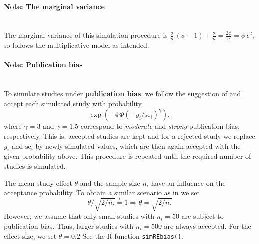\documentclass[letterpaper, 9pt]{article}
\begin{document}
\paragraph{Note: The marginal variance}\mbox{}\\
The marginal variance of this simulation procedure is
$\frac{2}{n} \, (\phi-1) + \frac{2}{n} = \frac{2\phi}{n} = \phi \, \epsilon^2$, so follows the multiplicative
model as intended.


\paragraph{Note: Publication bias}\mbox{}\\
To simulate studies under \textbf{publication bias}, we follow the suggestion of \citet{henm:copa:10} and accept each simulated study with probability
$$\exp(-4\, \Phi(-y_i / \text{se}_i)^\gamma ),$$
where $\gamma = 3$ and $\gamma = 1.5$ correspond to \emph{moderate} and \emph{strong} publication bias, respectively.
This is, accepted studies are kept and for a rejected study we replace $y_i$ and $\text{se}_i$ by newly simulated values, which are then again accepted with the given probability above.
This procedure is repeated until the required number of studies is simulated. 

The mean study effect $\theta$ and the sample size $n_i$ have an influence on the acceptance probability.
To obtain a similar scenario as in \citet{henm:copa:10} we set
$$ \theta / \sqrt{2/n_i}  \overset{!}{=} 1 \Rightarrow \theta = \sqrt{2/n_i}$$
However, we assume that only small studies with $n_i = 50$ are subject to publication bias. Thus, larger studies with $n_i = 500$ are always accepted. For the effect size, we set $\theta = 0.2$
See the R function \texttt{simREbias()}.


\end{document}
